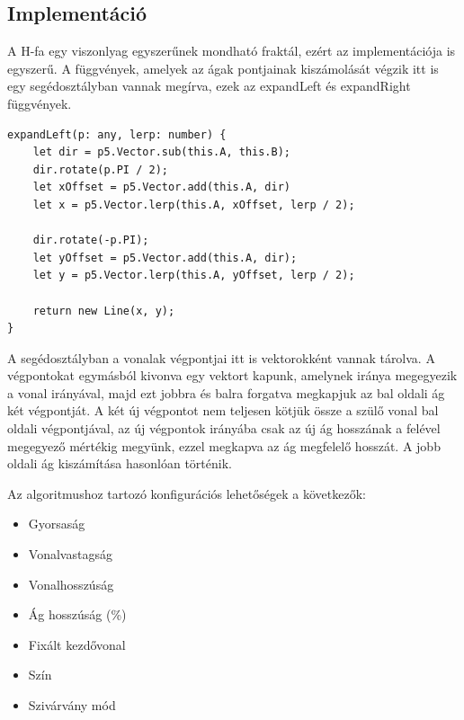 \subsection*{Implementáció}
A H-fa egy viszonlyag egyszerűnek mondható fraktál, ezért az implementációja is egyszerű. A függvények, amelyek az ágak pontjainak kiszámolását végzik itt is egy segédosztályban vannak megírva, ezek az expandLeft és expandRight függvények.
\begin{lstlisting}
expandLeft(p: any, lerp: number) {
	let dir = p5.Vector.sub(this.A, this.B);
	dir.rotate(p.PI / 2);
	let xOffset = p5.Vector.add(this.A, dir)
	let x = p5.Vector.lerp(this.A, xOffset, lerp / 2);
	
	dir.rotate(-p.PI);
	let yOffset = p5.Vector.add(this.A, dir);
	let y = p5.Vector.lerp(this.A, yOffset, lerp / 2);
	
	return new Line(x, y);
}
\end{lstlisting}
A segédosztályban a vonalak végpontjai itt is vektorokként vannak tárolva. A végpontokat egymásból kivonva egy vektort kapunk, amelynek iránya megegyezik a vonal irányával, majd ezt jobbra és balra forgatva megkapjuk az bal oldali ág két végpontját. A két új végpontot nem teljesen kötjük össze a szülő vonal bal oldali végpontjával, az új végpontok irányába csak az új ág hosszának a felével megegyező mértékig megyünk, ezzel megkapva az ág megfelelő hosszát. A jobb oldali ág kiszámítása hasonlóan történik.
\par Az algoritmushoz tartozó konfigurációs lehetőségek a következők:
\begin{itemize}
	\item Gyorsaság
	\item Vonalvastagság
	\item Vonalhosszúság
	\item Ág hosszúság (\%)
	\item Fixált kezdővonal
	\item Szín
	\item Szivárvány mód
\end{itemize}